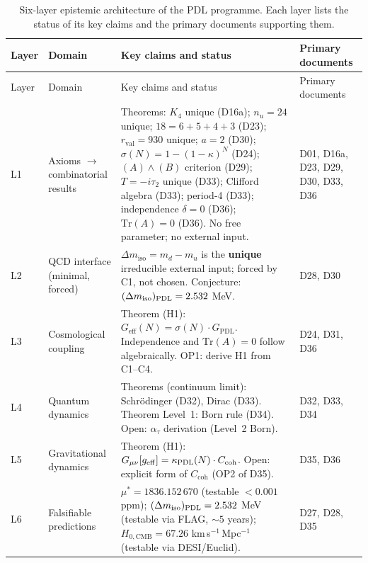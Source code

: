 \documentclass[11pt,a4paper]{article}
\theoremstyle{plain}
\theoremstyle{definition}
\theoremstyle{remark}
\newcommand{\PDL}{\textnormal{PDL}}
\newcommand{\Kfour}{K_4}
\newcommand{\Geff}{G_{\mathrm{eff}}}
\newcommand{\GPDL}{G_{\mathrm{PDL}}}
\newcommand{\rval}{r_{\mathrm{val}}}
\newcommand{\sigmaN}{\sigma(N)}
\newcommand{\mustar}{\mu^*}
\begin{document}
\begin{longtable}{@{}L{0.6cm}L{3.0cm}L{5.5cm}L{4.0cm}@{}}
\caption{Six-layer epistemic architecture of the PDL programme.  Each layer lists the status of its key claims and the primary documents supporting them.}
\label{tab:epistemic}\\
\toprule
Layer & Domain & Key claims and status & Primary documents \\
\midrule
\endfirsthead
\toprule
Layer & Domain & Key claims and status & Primary documents \\
\midrule
\endhead
\bottomrule
\endfoot

L1 & Axioms $\to$ combinatorial results &
\textcolor{proofblue}{Theorems}: $\Kfour$ unique (D16a); $n_u=24$ unique; $18=6+5+4+3$ (D23); $\rval=930$ unique; $a=2$ (D30); $\sigma(N)=1-(1-\kappa)^N$ (D24); $(A)\wedge(B)$ criterion (D29); $T=-i\tau_2$ unique (D33); Clifford algebra (D33); period-4 (D33); independence $\delta=0$ (D36); $\mathrm{Tr}(A)=0$ (D36).
No free parameter; no external input. &
D01, D16a, D23, D29, D30, D33, D36 \\[0.4em]

L2 & QCD interface (minimal, forced) &
$\Delta m_{\mathrm{iso}} = m_d - m_u$ is the \textbf{unique} irreducible external input; forced by C1, not chosen.
\textcolor{conjecturegreen}{Conjecture}: $(\Delta m_{\mathrm{iso}})_{\PDL}=2.532$ MeV. &
D28, D30 \\[0.4em]

L3 & Cosmological coupling &
\textcolor{proofblue}{Theorem (H1)}: $\Geff(N)=\sigmaN\cdot\GPDL$.
Independence and $\mathrm{Tr}(A)=0$ follow algebraically.
\textcolor{openproblemred}{OP1}: derive H1 from C1--C4. &
D24, D31, D36 \\[0.4em]

L4 & Quantum dynamics &
\textcolor{proofblue}{Theorems} (continuum limit): Schr\"odinger (D32), Dirac (D33).
\textcolor{proofblue}{Theorem Level~1}: Born rule (D34).
\textcolor{openproblemred}{Open}: $\alpha_\tau$ derivation (Level~2 Born). &
D32, D33, D34 \\[0.4em]

L5 & Gravitational dynamics &
\textcolor{proofblue}{Theorem (H1)}: $G_{\mu\nu}[g_{\mathrm{eff}}]=\kappa_{\PDL}(N)\cdot C_{\mathrm{coh}}$.
\textcolor{openproblemred}{Open}: explicit form of $C_{\mathrm{coh}}$ (OP2 of D35). &
D35, D36 \\[0.4em]

L6 & Falsifiable predictions &
$\mustar=1836.152\,670$ (testable $<0.001$ ppm);
$(\Delta m_{\mathrm{iso}})_{\PDL}=2.532$ MeV (testable via FLAG, $\sim 5$ years);
$H_{0,\mathrm{CMB}}=67.26$ km\,s$^{-1}$\,Mpc$^{-1}$ (testable via DESI/Euclid). &
D27, D28, D35 \\[0.4em]

\end{longtable}
\end{document}
